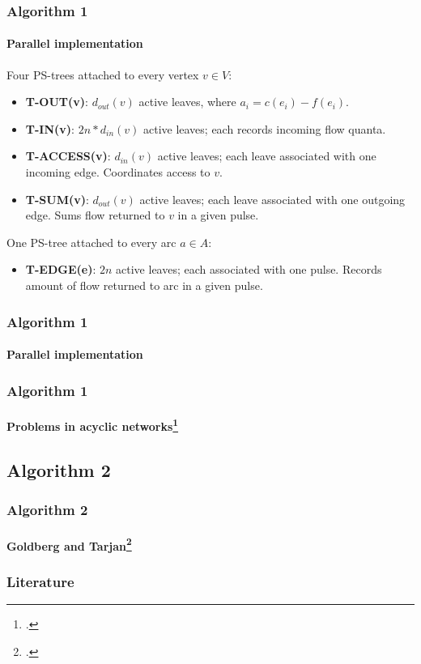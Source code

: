 \documentclass{beamer}
\begin{document}
\begin{frame}
\frametitle{Algorithm 1}
\framesubtitle{Parallel implementation} 
Four PS-trees attached to every vertex $v\in V$:
\begin{itemize}
	\item \textbf{T-OUT(v)}: $d_{out}(v)$ active leaves, where $a_i=c(e_i)-f(e_i)$.
	\item \textbf{T-IN(v)}: $2n*d_{in}(v)$ active leaves; each records incoming flow quanta.
	\item \textbf{T-ACCESS(v)}: $d_{in}(v)$ active leaves; each leave associated with one incoming edge. Coordinates access to $v$. 
	\item \textbf{T-SUM(v)}: $d_{out}(v)$ active leaves; each leave associated with one outgoing edge. Sums flow returned to $v$ in a given pulse. 
\end{itemize}
One PS-tree attached to every arc $a\in A$:
\begin{itemize}
	\item \textbf{T-EDGE(e)}: $2n$ active leaves; each associated with one pulse. Records amount of flow returned to arc in a given pulse.
\end{itemize}
\end{frame}

\begin{frame}
\frametitle{Algorithm 1}
\framesubtitle{Parallel implementation}
\end{frame}


\begin{comment}
only n processors (just state)
2n bound proof
\end{comment}




\begin{frame}
\frametitle{Algorithm 1}
\framesubtitle{Problems in acyclic networks\footcite{vishkin92}} 
\end{frame}

\begin{comment}
Just mention briefly
\end{comment}

\subsection{Algorithm 2}
\begin{frame}
\frametitle{Algorithm 2}
\framesubtitle{Goldberg and Tarjan\footcite{goldberg89}} 
\end{frame}
\begin{comment}
Atomic method
proof (?)
\end{comment}
 	 
\begin{frame}[allowframebreaks]
\frametitle<presentation>{Literature}    
\printbibliography
\end{frame} 	 
 	 
\end{document}
